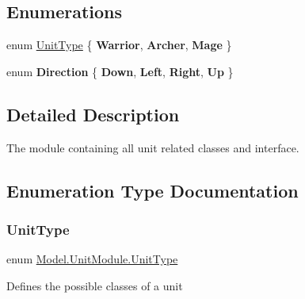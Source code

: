 \subsection*{Enumerations}
\begin{DoxyCompactItemize}
\item 
enum \hyperlink{namespace_model_1_1_unit_module_aba9769f408747bf38d0d8adca8f68c98}{Unit\+Type} \{ {\bfseries Warrior}, 
{\bfseries Archer}, 
{\bfseries Mage}
 \}
\item 
\hypertarget{namespace_model_1_1_unit_module_a2190d47860930ffa3dd911d3a3075c02}{}\label{namespace_model_1_1_unit_module_a2190d47860930ffa3dd911d3a3075c02} 
enum {\bfseries Direction} \{ {\bfseries Down}, 
{\bfseries Left}, 
{\bfseries Right}, 
{\bfseries Up}
 \}
\end{DoxyCompactItemize}


\subsection{Detailed Description}
The module containing all unit related classes and interface. 



\subsection{Enumeration Type Documentation}
\hypertarget{namespace_model_1_1_unit_module_aba9769f408747bf38d0d8adca8f68c98}{}\label{namespace_model_1_1_unit_module_aba9769f408747bf38d0d8adca8f68c98} 
\subsubsection{\texorpdfstring{Unit\+Type}{UnitType}}
{\footnotesize\ttfamily enum \hyperlink{namespace_model_1_1_unit_module_aba9769f408747bf38d0d8adca8f68c98}{Model.\+Unit\+Module.\+Unit\+Type}\hspace{0.3cm}{\ttfamily [strong]}}

Defines the possible classes of a unit 
